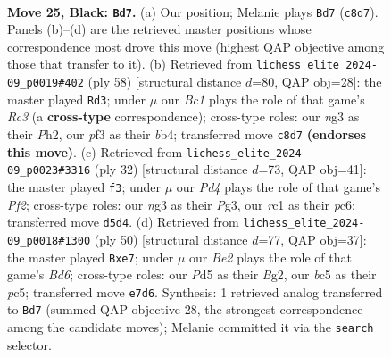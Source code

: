 \documentclass[11pt]{article}
\begin{document}
\clearpage

\begin{figure}[p]\centering
\begin{subfigure}{0.46\textwidth}\centering
\resizebox{\linewidth}{!}{%
\newchessgame
\chessboard[
  setfen={r1b2kr1/1p2bp1p/p5p1/2Bp4/8/3K1PN1/PP4PP/2R2B1R b - - 0 25},
  showmover=false,
  pgfstyle=straightmove, color=movearrow, markmove={c8-d7}
]}
\caption{}
\end{subfigure}\hfill
\begin{subfigure}{0.46\textwidth}\centering
\resizebox{\linewidth}{!}{%
\newchessgame
\chessboard[
  setfen={1k1r4/1p3p1p/3rb3/5p1N/1b1n4/2R2PB1/1P4PP/5R1K w - - 2 30},
  showmover=false,
  pgfstyle=straightmove, color=movearrow, markmove={c3-d3}
]}
\caption{}
\end{subfigure}
\\[4pt]
\begin{subfigure}{0.46\textwidth}\centering
\resizebox{\linewidth}{!}{%
\newchessgame
\chessboard[
  setfen={r6r/p2k1ppp/2p2n2/3b4/8/B5P1/P3PPBP/R3K2R w KQ - 0 17},
  showmover=false,
  pgfstyle=straightmove, color=movearrow, markmove={f2-f3}
]}
\caption{}
\end{subfigure}\hfill
\begin{subfigure}{0.46\textwidth}\centering
\resizebox{\linewidth}{!}{%
\newchessgame
\chessboard[
  setfen={3r3k/4nrbp/p2B4/1pp2p2/8/6P1/PP3PBP/R2R2K1 w - - 2 26},
  showmover=false,
  pgfstyle=straightmove, color=movearrow, markmove={d6-e7}
]}
\caption{}
\end{subfigure}
\caption{\textbf{Move 25, Black: \texttt{Bd7}.} (a) Our position; Melanie plays \texttt{Bd7} (\texttt{c8d7}). Panels (b)--(d) are the retrieved master positions whose correspondence most drove this move (highest QAP objective among those that transfer to it). (b) Retrieved from \texttt{lichess\_elite\_2024-09\_p0019\#402} (ply 58) [structural distance $d$=80, QAP obj=28]: the master played \texttt{Rd3}; under $\mu$ our \emph{Bc1} plays the role of that game's \emph{Rc3} (a \textbf{cross-type} correspondence); cross-type roles: our \emph{n}g3 as their \emph{P}h2, our \emph{p}f3 as their \emph{b}b4; transferred move \texttt{c8d7} \textbf{(endorses this move)}. (c) Retrieved from \texttt{lichess\_elite\_2024-09\_p0023\#3316} (ply 32) [structural distance $d$=73, QAP obj=41]: the master played \texttt{f3}; under $\mu$ our \emph{Pd4} plays the role of that game's \emph{Pf2}; cross-type roles: our \emph{n}g3 as their \emph{P}g3, our \emph{r}c1 as their \emph{p}c6; transferred move \texttt{d5d4}. (d) Retrieved from \texttt{lichess\_elite\_2024-09\_p0018\#1300} (ply 50) [structural distance $d$=77, QAP obj=37]: the master played \texttt{Bxe7}; under $\mu$ our \emph{Be2} plays the role of that game's \emph{Bd6}; cross-type roles: our \emph{P}d5 as their \emph{B}g2, our \emph{b}c5 as their \emph{p}c5; transferred move \texttt{e7d6}. Synthesis: 1 retrieved analog transferred to \texttt{Bd7} (summed QAP objective 28, the strongest correspondence among the candidate moves); Melanie committed it via the \texttt{search} selector.}
\label{fig:thought-m49}
\end{figure}
\end{document}
